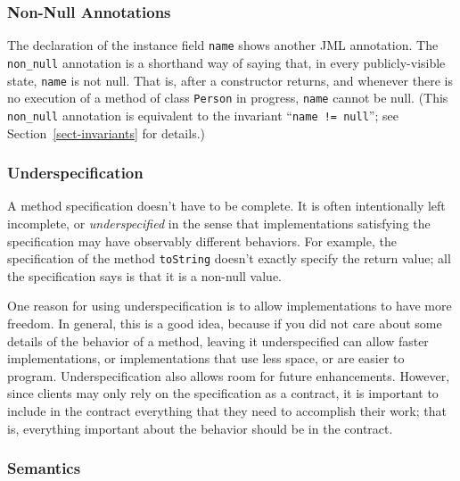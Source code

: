 \documentclass[twocolumn]{article}
\begin{document}
\subsubsection{Non-Null Annotations}

The declaration of the instance field \texttt{name} shows another JML
annotation.  The 
\texttt{non\_null} annotation is a shorthand way of saying that,
in every publicly-visible state, \texttt{name} is not null.
That is, after a constructor returns, and whenever there is no
execution of a method of class \texttt{Person} in progress,
\texttt{name} cannot be null.
(This \texttt{non\_null} annotation is equivalent to the invariant
``\texttt{name != null}''; see Section~\ref{sect-invariants} for details.)

\subsubsection{Underspecification}

A method specification doesn't have to be complete. It is often
intentionally left incomplete, or \emph{underspecified\/} in the sense
that implementations satisfying the specification may have observably
different behaviors.
For example, the specification of the
method \texttt{toString} doesn't exactly specify the return value; all
the specification says is that it is a non-null value.

One reason for using underspecification is to allow implementations to
have more freedom.  In general, this is a good idea, because if you
did not care about some details of the behavior of a method, leaving
it underspecified can allow faster implementations, or implementations
that use less space, or are easier to program.  Underspecification
also allows room for future enhancements.  However, since clients may
only rely on the specification as a contract, it is important to include
in the contract everything that they need to accomplish their work;
that is, everything important about the behavior should be in the contract.

\subsubsection{Semantics}
\end{document}
